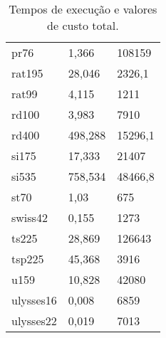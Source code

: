 \begin{table}
\begin{minipage}[b]{0.7\linewidth}
{\begin{tabular}{lll}
pr76      & 1,366   & 108159  \\
rat195    & 28,046  & 2326,1  \\
rat99     & 4,115   & 1211    \\
rd100     & 3,983   & 7910    \\
rd400     & 498,288 & 15296,1 \\
si175     & 17,333  & 21407   \\
si535     & 758,534 & 48466,8 \\
st70      & 1,03    & 675     \\
swiss42   & 0,155   & 1273    \\
ts225     & 28,869  & 126643  \\
tsp225    & 45,368  & 3916    \\
u159      & 10,828  & 42080   \\
ulysses16 & 0,008   & 6859    \\
ulysses22 & 0,019   & 7013   \\
\hline 
\end{tabular}
}
\end{minipage}
\caption{Tempos de execução e valores de custo total.}
\label{tabelaTempos}
\end{table} 


